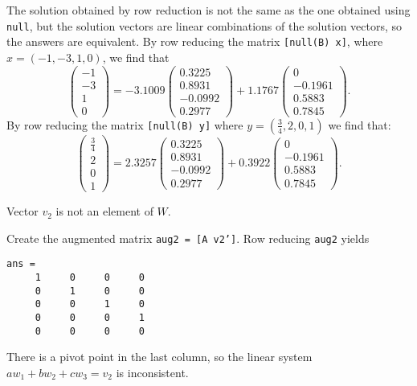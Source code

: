 The solution obtained by row reduction is not the same as the one
obtained using {\tt null}, but the solution vectors are linear
combinations of the \Matlab solution vectors, so the answers are
equivalent.  By row reducing the matrix {\tt [null(B) x]}, where
$x = (-1,-3,1,0)$, we find that
\[
\left(\begin{array}{r} -1 \\ -3 \\ 1 \\ 0 \end{array}\right) =
-3.1009\left(\begin{array}{r} 0.3225 \\ 0.8931 \\ -0.0992 \\ 0.2977
\end{array}\right) + 1.1767\left(\begin{array}{r} 0 \\ -0.1961 \\
0.5883 \\ 0.7845 \end{array}\right).
\]
By row reducing the matrix {\tt [null(B) y]} where $y = (\frac{3}{4},
2,0,1)$ we find that:
\[
\left(\begin{array}{r} \frac{3}{4} \\ 2 \\ 0 \\ 1 \end{array}\right) =
2.3257\left(\begin{array}{r} 0.3225 \\ 0.8931 \\ -0.0992 \\ 0.2977
\end{array}\right) + 0.3922\left(\begin{array}{r} 0 \\ -0.1961 \\
0.5883 \\ 0.7845 \end{array}\right).
\]

 \ans Vector $v_2$ is not an element of $W$.

\soln Create the augmented matrix {\tt aug2 = [A v2']}.  Row reducing
{\tt aug2} yields
\begin{verbatim}
ans =
     1     0     0     0
     0     1     0     0
     0     0     1     0
     0     0     0     1
     0     0     0     0
\end{verbatim}
There is a pivot point in the last column, so the linear system
$aw_1 + bw_2 + cw_3 = v_2$ is inconsistent.



